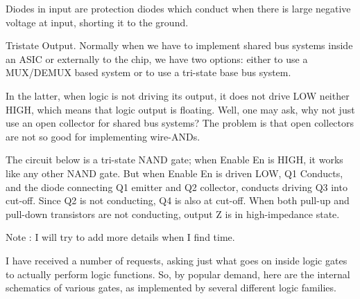   Diodes in input are protection diodes which conduct when there is large negative voltage at input, shorting it to the ground.






   Tristate Output.
  Normally when we have to implement shared bus systems inside an ASIC or externally to the chip, we have two options: either to use a MUX/DEMUX based system or to use a tri-state base bus system.



  In the latter, when logic is not driving its output, it does not drive LOW neither HIGH, which means that logic output is floating. Well, one may ask, why not just use an open collector for shared bus systems? The problem is that open collectors are not so good for implementing wire-ANDs.



  The circuit below is a tri-state NAND gate; when Enable En is HIGH, it works like any other NAND gate. But when Enable En is driven LOW, Q1 Conducts, and the diode connecting Q1 emitter and Q2 collector, conducts driving Q3 into cut-off. Since Q2 is not conducting, Q4 is also at cut-off. When both pull-up and pull-down transistors are not conducting, output Z is in high-impedance state.






  Note : I will try to add more details when I find time.











































I have received a number of requests, asking just what goes on inside logic gates to actually perform logic functions. So, by popular demand, here are the internal schematics of various gates, as implemented by several different logic families.

